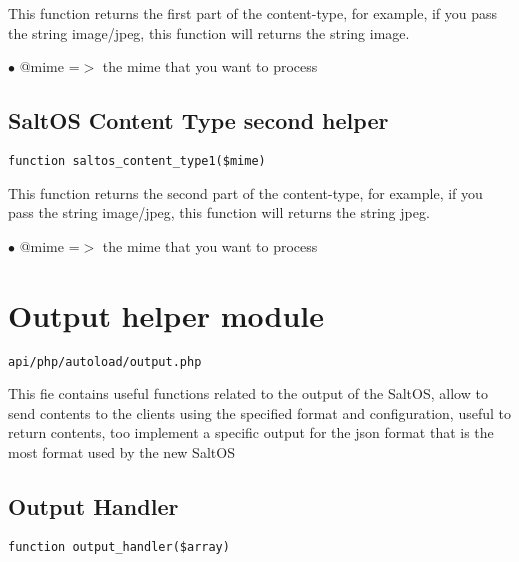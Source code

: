 \documentclass[a4paper]{book}
\begin{document}
This function returns the first part of the content-type, for example, if you
pass the string image/jpeg, this function will returns the string image.

\begin{compactitem}
\item[\color{myblue}$\bullet$] @mime =$>$ the mime that you want to process
\end{compactitem}

\hypertarget{toc213}{}
\subsection{SaltOS Content Type second helper}

\begin{lstlisting}
function saltos_content_type1($mime)
\end{lstlisting}

This function returns the second part of the content-type, for example, if you
pass the string image/jpeg, this function will returns the string jpeg.

\begin{compactitem}
\item[\color{myblue}$\bullet$] @mime =$>$ the mime that you want to process
\end{compactitem}

\hypertarget{toc214}{}
\section{Output helper module}

\begin{lstlisting}
api/php/autoload/output.php
\end{lstlisting}

This fie contains useful functions related to the output of the SaltOS, allow to send contents to
the clients using the specified format and configuration, useful to return contents, too implement
a specific output for the json format that is the most format used by the new SaltOS

\hypertarget{toc215}{}
\subsection{Output Handler}

\begin{lstlisting}
function output_handler($array)
\end{lstlisting}
\end{document}
